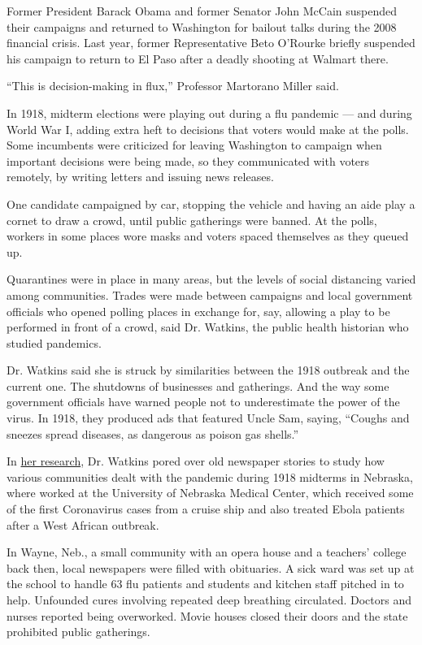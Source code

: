 Former President Barack Obama and former Senator John McCain suspended
their campaigns and returned to Washington for bailout talks during the
2008 financial crisis. Last year, former Representative Beto O'Rourke
briefly suspended his campaign to return to El Paso after a deadly
shooting at Walmart there.

``This is decision-making in flux,'' Professor Martorano Miller said.

In 1918, midterm elections were playing out during a flu pandemic ---
and during World War I, adding extra heft to decisions that voters would
make at the polls. Some incumbents were criticized for leaving
Washington to campaign when important decisions were being made, so they
communicated with voters remotely, by writing letters and issuing news
releases.

One candidate campaigned by car, stopping the vehicle and having an aide
play a cornet to draw a crowd, until public gatherings were banned. At
the polls, workers in some places wore masks and voters spaced
themselves as they queued up.

Quarantines were in place in many areas, but the levels of social
distancing varied among communities. Trades were made between campaigns
and local government officials who opened polling places in exchange
for, say, allowing a play to be performed in front of a crowd, said Dr.
Watkins, the public health historian who studied pandemics.

Dr. Watkins said she is struck by similarities between the 1918 outbreak
and the current one. The shutdowns of businesses and gatherings. And the
way some government officials have warned people not to underestimate
the power of the virus. In 1918, they produced ads that featured Uncle
Sam, saying, ``Coughs and sneezes spread diseases, as dangerous as
poison gas shells.''

In
\href{https://digitalcommons.unmc.edu/cgi/viewcontent.cgi?referer=https://www.google.com/\&httpsredir=1\&article=1042\&context=etd}{her
research}, Dr. Watkins pored over old newspaper stories to study how
various communities dealt with the pandemic during 1918 midterms in
Nebraska, where worked at the University of Nebraska Medical Center,
which received some of the first Coronavirus cases from a cruise ship
and also treated Ebola patients after a West African outbreak.

In Wayne, Neb., a small community with an opera house and a teachers'
college back then, local newspapers were filled with obituaries. A sick
ward was set up at the school to handle 63 flu patients and students and
kitchen staff pitched in to help. Unfounded cures involving repeated
deep breathing circulated. Doctors and nurses reported being overworked.
Movie houses closed their doors and the state prohibited public
gatherings.

